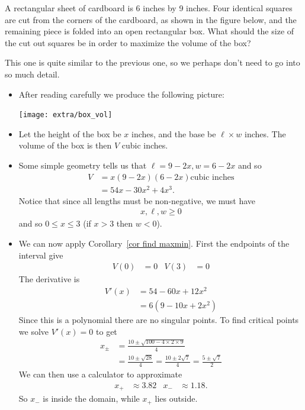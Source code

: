 \begin{eg}\label{APPglobalMaxMinC}
A rectangular sheet of cardboard is 6 inches by 9 inches. Four
identical squares are cut from the corners of the cardboard, as shown in
the figure below, and the remaining piece is folded into an open
rectangular box. What should the size of the cut out squares be in
order to maximize the volume of the box?

\soln This one is quite similar to the previous one, so we perhaps don't need to go into
so much detail.
\begin{itemize}
 \item After reading carefully we produce the following picture:
\begin{efig}
\begin{center}
   \texttt{[image: extra/box\_vol]}
\end{center}
\end{efig}

\item Let the height of the box be $x$ inches, and the base be $\ell \times w$ inches.
The volume of the box is then $V$ cubic inches.
\item Some simple geometry tells us that $\ell = 9-2x, w=6-2x$ and so
\begin{align*}
V &= x(9-2x)(6-2x) \text{cubic inches}\\
  &= 54x-30x^2+4x^3.
\end{align*}
Notice that since all lengths must be non-negative, we must have
\begin{align*}
  x,\ell,w \geq 0
\end{align*}
and so $0 \leq x \leq 3$ (if $x>3$ then $w<0$).
\item We can now apply Corollary~\ref{cor find maxmin}. First the endpoints of the
interval give
\begin{align*}
  V(0) &= 0 & V(3) &= 0
\end{align*}
The derivative is
\begin{align*}
  V'(x) &= 54 - 60x +12x^2 \\
  &= 6(9-10x+2x^2)
\end{align*}
Since this is a polynomial there are no singular points. To find critical points we solve
$V'(x) = 0$ to get
\begin{align*}
  x_\pm &= \frac{10 \pm \sqrt{100 - 4\times2\times9}}{4} \\
  &= \frac{10 \pm \sqrt{28}}{4} = \frac{10 \pm 2\sqrt{7}}{4} = \frac{5 \pm \sqrt{7}}{2}
\end{align*}
We can then use a calculator to approximate
\begin{align*}
  x_+ &\approx 3.82 & x_- &\approx 1.18.
\end{align*}
So $x_-$ is inside the domain, while $x_+$ lies outside.


\end{itemize}
\end{eg}
